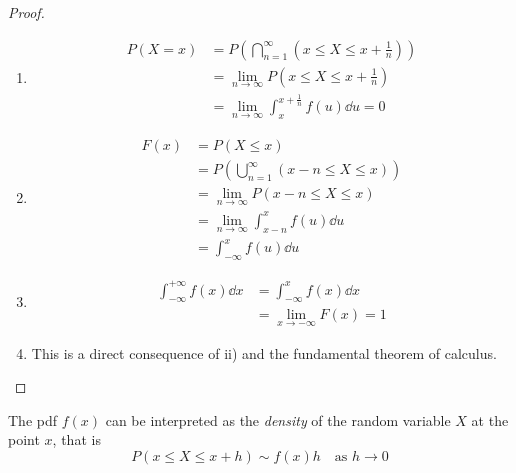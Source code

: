 \documentclass[12pt]{extarticle}
\begin{document}
\begin{proof}
    \skiplineafterproof
    \begin{enumerate}[label=\roman*)]
        \item
              \begin{align}
                  P(X = x) & = P(\bigcap_{n=1}^\infty (x \leq X \leq x + \frac{1}{n}))      \\
                           & = \lim_{n \to \infty} P(x \leq X \leq x + \frac{1}{n})         \\
                           & = \lim_{n \to \infty} \int_x^{x + \frac{1}{n}} f(u) \dd{u} = 0
              \end{align}

        \item
              \begin{align}
                  F(x) & = P(X \leq x)                                  \\
                       & = P (\bigcup_{n=1}^\infty (x-n \leq X \leq x)) \\
                       & = \lim_{n \to \infty} P(x-n \leq X \leq x)     \\
                       & = \lim_{n \to \infty} \int_{x-n}^x f(u) \dd{u} \\
                       & = \int_{-\infty}^x f(u) \dd{u}
              \end{align}

        \item
              \begin{align}
                  \int_{-\infty}^{+\infty} f(x) \dd{x} & = \int_{-\infty}^x f(x) \dd{x}  \\
                                                       & = \lim_{x \to -\infty} F(x) = 1
              \end{align}
        \item This is a direct consequence of ii) and the fundamental theorem of calculus.
    \end{enumerate}
\end{proof}

\begin{remark}
    The pdf $f(x)$ can be interpreted as the \emph{density} of the random variable $X$ at the point $x$, that is
    \begin{equation}
        P(x \leq X \leq x + h) \sim f(x) h \quad \text{as } h \to 0
    \end{equation}
\end{remark}
\end{document}
